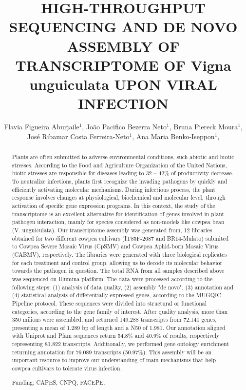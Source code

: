 \documentclass[twoside]{article}
\title{\vspace{-15mm}\fontsize{24pt}{10pt}\selectfont\textbf{ HIGH-THROUGHPUT SEQUENCING AND DE NOVO ASSEMBLY OF TRANSCRIPTOME OF Vigna unguiculata UPON VIRAL INFECTION }} %
\author{ Flavia Figueira Aburjaile$^{1}$, João Pacifico Bezerra Neto$^{1}$, Bruna Piereck Moura$^{1}$, José Ribamar Costa Ferreira-Neto$^{1}$, Ana Maria Benko-Iseppon$^{1}$, }
\affil{ 1 Federal University of Pernambuco, Center of Biological Sciences, Genetics Dept

 }
\date{}
\begin{document}
  
  
  \maketitle %
  
  
  \thispagestyle{fancy} %
  
  
  \begin{abstract}
  Plants are often submitted to adverse environmental conditions, such abiotic and biotic stresses. According to the Food and Agriculture Organization of the United Nations, biotic stresses are responsible for diseases leading to 32 – 42\% of productivity decrease. To neutralize infections, plants first recognize the invading pathogens by quickly and efficiently activating molecular mechanisms. During  infectious process, the plant response involves changes at physiological, biochemical and molecular level, through activation of specific gene expression programs. In this context, the study of the transcriptome is an excellent alternative for identification of genes involved in plant-pathogen interaction, mainly for species considered as non-models like cowpea bean (V. unguiculata). Our transcriptome assembly was generated from, 12 libraries obtained for two different cowpea cultivars (IT85F-2687 and BR14-Mulato) submited to Cowpea Severe Mosaic Virus (CpSMV) and Cowpea Aphid-born Mosaic Virus (CABMV), respectively. The libraries were generated with three biological replicates for each treatment and control group, allowing us to decode its molecular behavior towards the pathogen in question. The total RNA from all samples described above was sequenced on Illumina platform. The data were processed according to the following steps: (1) analysis of data quality, (2) assembly "de novo", (3) annotation and (4) statistical analysis of differentially expressed genes, according to the MUGQIC Pipeline protocol. These sequences were divided into structural or functional categories, according to the gene family of interest. After quality analysis, more than 350 milions were assembled, and returned 149.288 transcripts from 72.140 genes, presenting a mean of 1.289 bp of length and a N50 of 1.981. Our annotation aligned with Uniprot and Pfam sequences return 54.8\% and 40.9\% of results, respectively representing 81.822 transcripts. Additionally, we performed gene ontology enrichment returning annotation for 76.089 transcripts (50.97\%). This assembly will be an important resource to improve our understanding of main mechanisms that help cowpea cultivars to tolerate virus infection.
  
  Funding: CAPES, CNPQ, FACEPE. \\ 
  \end{abstract}
  
\end{document}
